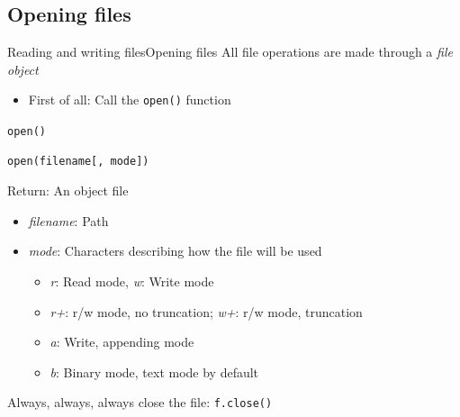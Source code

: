 \documentclass[10pt,compress]{beamer} %
\begin{document}
\subsection{Opening files}
\begin{frame}[fragile]{Reading and writing files}{Opening files}
	All file operations are made through a \textit{file object}
		\begin{itemize}
		\item \small{First of all: Call the \texttt{open()} function}
		\end{itemize}

	\begin{block}{\texttt{open()}}
	\vspace{-0.2cm}
\begin{verbatim}
open(filename[, mode])
\end{verbatim}
	\vspace{-0.2cm}
	Return: An object file\\
	\vspace{-0.2cm}
	\begin{itemize}
	\item \textit{filename}: Path
	\item \textit{mode}: Characters describing how the file will be used
		\begin{itemize}
		\item \textit{r}: Read mode, \textit{w}: Write mode %
        \item \textit{r+}: r/w mode, no truncation; \textit{w+}: r/w mode, truncation
        \item \textit{a}: Write, appending mode
		\item \textit{b}: Binary mode, text mode by default
		\end{itemize}
	\end{itemize}
	\end{block}

	\smallskip

	\begin{alertblock}{}
	Always, always, always close the file: \texttt{f.close()}
	\end{alertblock}
\end{frame}
\end{document}
